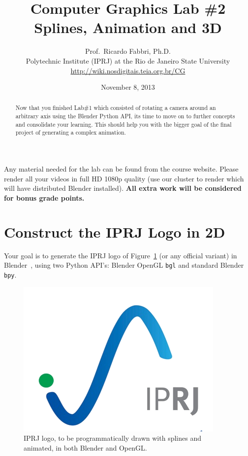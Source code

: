 \documentclass[a4paper]{article}
\begin{document}
\title{\textsf{Computer Graphics Lab \#2\\ Splines, Animation and 3D}
} 

\author{Prof.\ Ricardo Fabbri, Ph.D.\\[1em]
\small{Polytechnic Institute (IPRJ) at the Rio de Janeiro State University}\\
\small{\url{http://wiki.nosdigitais.teia.org.br/CG}}
}
 

\date{November 8, 2013}
\maketitle
\begin{abstract}
Now that you finished Lab\#1 which consisted of rotating a camera around an
arbitrary axis using the Blender Python API, its time to move on to further concepts and consolidate your
learning. This should help you with the bigger goal of the final project
of generating a complex animation.
\end{abstract}
\vspace{2em}

Any material needed for the lab can be found from the course
website. Please render all your videos in full HD 1080p quality (use our
cluster to render which will have distributed Blender installed).
\textbf{All extra work will be considered for bonus grade points.}

\section{Construct the IPRJ Logo in 2D}
Your goal is to generate the IPRJ logo of Figure~\ref{fig:iprj:logo} (or any
official variant) in Blender~\cite{blender},
using two Python API's: Blender OpenGL \texttt{bgl} and standard Blender \texttt{bpy}. 
\begin{figure}
\centering
\includegraphics[width=0.5\linewidth]{figs/logo-iprj2.png}%
\caption{%
IPRJ logo, to be programmatically drawn with splines and animated, in both
Blender and OpenGL.
}\label{fig:iprj:logo}
\end{figure}
\end{document}
